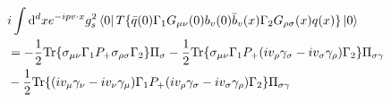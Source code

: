 \documentclass[openright,twoside,12pt,a4paper,final]{article}
\begin{document}
	\begin{align}
		&i \int \mathrm{d}^d x e^{-i p v \cdot x} g_s^2 \bra{0} T\{\bar{q}(0) \Gamma_1 G_{\mu \nu}(0) b_v(0) \bar{b}_v(x) \Gamma_2 G_{\rho \sigma}(x) q(x)\} \ket{0} \noindent \\ &= -\frac{1}{2} \mathrm{Tr} \{\sigma_{\mu \nu} \Gamma_1 P_+ \sigma_{\rho \sigma} \Gamma_2\} \Pi_{\sigma} - \frac{1}{2} \mathrm{Tr} \{\sigma_{\mu \nu} \Gamma_1 P_+ (i v_{\rho} \gamma_{\sigma} - i v_{\sigma} \gamma_{\rho}) \Gamma_2\} \Pi_{\sigma \gamma} \noindent \\ &- \frac{1}{2} \mathrm{Tr} \{(i v_{\mu} \gamma_{\nu} - i v_{\nu} \gamma_{\mu}) \Gamma_1 P_+ (i v_{\rho} \gamma_{\sigma} - i v_{\sigma} \gamma_{\rho}) \Gamma_2\} \Pi_{\sigma \gamma}
	\end{align}
\end{document}
